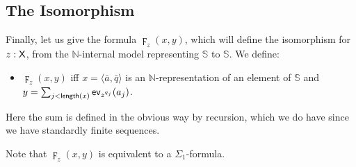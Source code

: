 \documentclass{amsart}
\newcommand{\tupel}[1]{{\langle #1 \rangle}}
\newcommand{\X}{{\sf X}}
\newcommand{\skippy}{}
\begin{document}
\subsection{The Isomorphism}\label{lachendesmurf}
Finally, let us give the formula $\digamma_z(x,y)$, which will define the isomorphism for $z:\X$, from the
$\mathbb N$-internal model representing $\mathbb S$ to $\mathbb S$.
We define:

\skippy
\begin{itemize}
    \item $\digamma_{z}(x,y)$ iff $x = \tupel{\bar{a},\bar{q}}$ is an $\mathbb N$-representation of an element of $\mathbb S$ and\\
    $y = \sum_{j<{\sf length}(x)}{\sf ev}_{z^{q_j}}(a_j)$.
\end{itemize}

\noindent
Here the sum is defined in the obvious way by recursion, which we do have since we have standardly finite sequences.

\skippy
Note that \noindent $\digamma_{z}(x,y)$ is equivalent to a $\Sigma_1$-formula.
\end{document}
